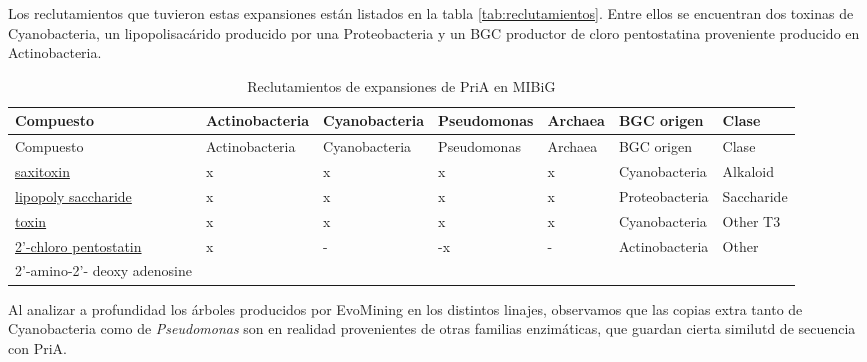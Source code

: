 \documentclass[12pt,twoside]{reedthesis}
\begin{document}
  Los reclutamientos que tuvieron estas expansiones están listados en la
  tabla \autoref{tab:reclutamientos}. Entre ellos se encuentran dos
  toxinas de Cyanobacteria, un lipopolisacárido producido por una
  Proteobacteria y un BGC productor de cloro pentostatina proveniente
  producido en Actinobacteria.
  
  \begin{longtable}[]{@{}lllllll@{}}
  \caption{Reclutamientos de expansiones de PriA en MIBiG
  \label{tab:reclutamientos}}\tabularnewline
  \toprule
  Compuesto & Actinobacteria & Cyanobacteria & Pseudomonas & Archaea & BGC
  origen & Clase\tabularnewline
  \midrule
  \endfirsthead
  \toprule
  Compuesto & Actinobacteria & Cyanobacteria & Pseudomonas & Archaea & BGC
  origen & Clase\tabularnewline
  \midrule
  \endhead
  \href{http://mibig.secondarymetabolites.org/repository/BGC0000188/index.html\#cluster-1}{saxitoxin}
  & x & x & x & x & Cyanobacteria & Alkaloid\tabularnewline
  \href{http://mibig.secondarymetabolites.org/repository/BGC0000775/index.html\#cluster-1}{lipopoly
  saccharide} & x & x & x & x & Proteobacteria & Saccharide\tabularnewline
  \href{http://mibig.secondarymetabolites.org/repository/BGC0000928/index.html\#cluster-1}{toxin}
  & x & x & x & x & Cyanobacteria & Other T3\tabularnewline
  \href{http://mibig.secondarymetabolites.org/repository/BGC0001484/index.html\#cluster-1}{2'-chloro
  pentostatin} & x & - & -x & - & Actinobacteria & Other\tabularnewline
  2'-amino-2'- deoxy adenosine & & & & & &\tabularnewline
  \bottomrule
  \end{longtable}
  
  Al analizar a profundidad los árboles producidos por EvoMining en los
  distintos linajes, observamos que las copias extra tanto de
  Cyanobacteria como de \emph{Pseudomonas} son en realidad provenientes de
  otras familias enzimáticas, que guardan cierta similutd de secuencia con
  PriA.
  
\end{document}
